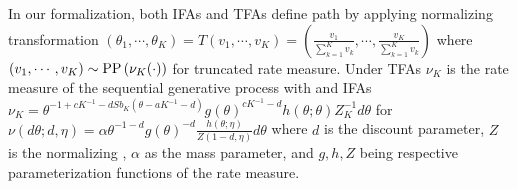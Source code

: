 \documentclass[letterpaper]{article}
\begin{document}
In our formalization, both IFAs and TFAs define path by applying normalizing transformation $(\theta_1,\cdots,\theta_K)=T(v_1,\cdots,v_K)=\left(\frac{v_1}{\sum_{k=1}^Kv_k},\cdots,\frac{v_K}{\sum_{k=1}^Kv_k}\right)$ where $(v_1,\cdots,v_K)\sim\mathrm{PP}\left(\nu_K(\cdot)\right)$ for truncated rate measure. Under TFAs $\nu_K$ is the rate measure of the sequential generative process with and IFAs $\nu_K=\theta^{-1+cK^{-1}-dSb_K(\theta-a K^{-1}-d)}g(\theta)^{cK^{-1}-d}h(\theta;\theta)Z_K^{-1}d\theta$ for $\nu(d\theta;d,\eta)=\alpha\theta^{-1-d}g(\theta)^{-d}\frac{h(\theta;\eta)}{Z(1-d,\eta)}d\theta$ where $d$ is the discount parameter, $Z$ is the normalizing , $\alpha$ as the mass parameter, and $g,h,Z$ being respective parameterization functions of the rate measure.

{
\small


}

\appendix
\end{document}
